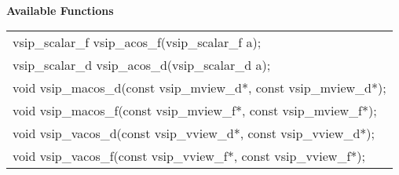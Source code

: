 \\\cvsiplh
\newline \hspace*{.8cm} \vspace*{.1cm} \textbf{Available Functions}\\
\hspace*{1.1cm} {
\ttfamily
\begin{tabular}[H]{l}
vsip\_scalar\_f vsip\_acos\_f(vsip\_scalar\_f a);\\
vsip\_scalar\_d vsip\_acos\_d(vsip\_scalar\_d a);\\
void vsip\_macos\_d(const vsip\_mview\_d*, const vsip\_mview\_d*);\\
void vsip\_macos\_f(const vsip\_mview\_f*, const vsip\_mview\_f*);\\
void vsip\_vacos\_d(const vsip\_vview\_d*, const vsip\_vview\_d*);\\
void vsip\_vacos\_f(const vsip\_vview\_f*, const vsip\_vview\_f*);\\
\end{tabular}
}
\\\pyjvsiph
{}
